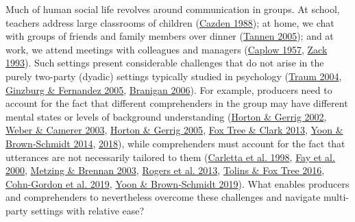 \documentclass[
  english,
]{article}
\begin{document}
Much of human social life revolves around communication in groups.
At school, teachers address large classrooms of children (\protect\hyperlink{ref-cazden1988classroom}{Cazden 1988}); at home, we chat with groups of friends and family members over dinner (\protect\hyperlink{ref-tannen2005conversational}{Tannen 2005}); and at work, we attend meetings with colleagues and managers (\protect\hyperlink{ref-caplow1957organizational}{Caplow 1957}, \protect\hyperlink{ref-zack1993interactivity}{Zack 1993}).
Such settings present considerable challenges that do not arise in the purely two-party (dyadic) settings typically studied in psychology (\protect\hyperlink{ref-traum2004}{Traum 2004}, \protect\hyperlink{ref-ginzburg2005}{Ginzburg \& Fernandez 2005}, \protect\hyperlink{ref-branigan2006}{Branigan 2006}).
For example, producers need to account for the fact that different comprehenders in the group may have different mental states or levels of background understanding (\protect\hyperlink{ref-horton2002}{Horton \& Gerrig 2002}, \protect\hyperlink{ref-weber2003}{Weber \& Camerer 2003}, \protect\hyperlink{ref-horton2005}{Horton \& Gerrig 2005}, \protect\hyperlink{ref-fox-tree2013}{Fox Tree \& Clark 2013}, \protect\hyperlink{ref-yoon2014}{Yoon \& Brown-Schmidt 2014}, \protect\hyperlink{ref-yoon2018}{2018}), while comprehenders must account for the fact that utterances are not necessarily tailored to them (\protect\hyperlink{ref-carletta1998}{Carletta et al. 1998}, \protect\hyperlink{ref-fay2000}{Fay et al. 2000}, \protect\hyperlink{ref-metzing2003}{Metzing \& Brennan 2003}, \protect\hyperlink{ref-rogers2013}{Rogers et al. 2013}, \protect\hyperlink{ref-tolins2016}{Tolins \& Fox Tree 2016}, \protect\hyperlink{ref-cohngordon}{Cohn-Gordon et al. 2019}, \protect\hyperlink{ref-yoon2019}{Yoon \& Brown‐Schmidt 2019}).
What enables producers and comprehenders to nevertheless overcome these challenges and navigate multi-party settings with relative ease?
\end{document}
